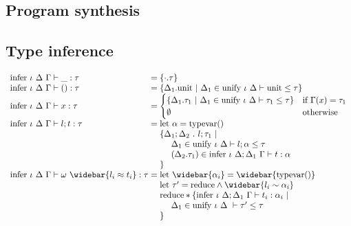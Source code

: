 \documentclass[manuscript]{acmart}
\begin{document}
\subsection{Program synthesis}
\subsection{Type inference}

\[
  \begin{array}{l @{} l}
    \text{infer } \iota\ \Delta\ \Gamma \vdash 
    \_ : \tau
    &{} =
    \{\cdot.\tau\}
    \\

    \text{infer } \iota\ \Delta\ \Gamma \vdash 
    () : \tau
    &{} =
    \begin{array}[t]{@{} l}
      \{\Delta_1.\text{unit}\ |
      \ \Delta_1 \in \text{unify } \iota\ \Delta \vdash \text{unit} \leq \tau
      \}
    \end{array}
    \\

    \text{infer } \iota\ \Delta\ \Gamma \vdash 
    x : \tau
    &{} =
    \begin{cases}  
      \{\Delta_1.\tau_1\ |
      \ \Delta_1 \in \text{unify } \iota\ \Delta \vdash \tau_1 \leq \tau
      \}
      &\text{if } \Gamma(x) = \tau_1
      \\
      \emptyset
      &\text{otherwise}
    \end{cases}
    \\

    \text{infer } \iota\ \Delta\ \Gamma \vdash 
    l ; t : \tau
    &{} =
    \begin{array}[t]{@{} l}
      \text{let } \alpha = \text{typevar}() 
      \\
      \{\Delta_1;\Delta_2\ .\ l ; \tau_1 \ |
      \\
      \ \ \ \ \Delta_1 \in \text{unify } \iota\ \Delta \vdash l ; \alpha \leq \tau
      \\
      \ \ \ \ (\Delta_2.\tau_1) \in \text{infer } \iota\ \Delta;\Delta_1\ \Gamma \vdash t : \alpha
      \\
      \}
    \end{array}
    \\

    \text{infer } \iota\ \Delta\ \Gamma \vdash 
    \omega\ \widebar{l_i \approx t_i} : \tau
    &{} =
    \begin{array}[t]{@{} l}
      \text{let } \widebar{\alpha_i} = \widebar{\text{typevar}()}
      \\
      \text{let } \tau' = \text{reduce} \wedge \widebar{l_i \sim \alpha_i}
      \\
      \text{reduce} * \{
      \text{infer } \iota\ \Delta;\Delta_1\ \Gamma \vdash t_i : \alpha_i\ |\ 
      \\
      \ \ \ \ \Delta_1 \in \text{unify } \iota\ \Delta\ \vdash \tau' \leq \tau
      \\
      \}
      \\
    \end{array}
    \\


\end{array}\]
\end{document}
